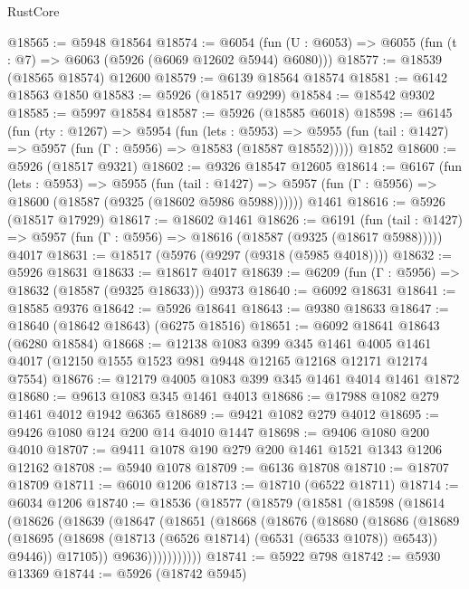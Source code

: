 \begin{lexlean}{RustCore}
\begin{coremodule}
@18565 := @5948 @18564
@18574 := @6054
    (fun (U : @6053) => @6055 (fun (t : @7) => @6063 (@5926 (@6069 @12602 @5944) @6080)))
@18577 := @18539 (@18565 @18574) @12600
@18579 := @6139 @18564 @18574
@18581 := @6142 @18563 @1850
@18583 := @5926 (@18517 @9299)
@18584 := @18542 @9302
@18585 := @5997 @18584
@18587 := @5926 (@18585 @6018)
@18598 := @6145
    (fun (rty : @1267) =>
    @5954
      (fun (lets : @5953) =>
      @5955 (fun (tail : @1427) => @5957 (fun (Γ : @5956) => @18583 (@18587 @18552)))))
    @1852
@18600 := @5926 (@18517 @9321)
@18602 := @9326 @18547 @12605
@18614 := @6167
    (fun (lets : @5953) =>
    @5955
      (fun (tail : @1427) =>
      @5957 (fun (Γ : @5956) => @18600 (@18587 (@9325 (@18602 @5986 @5988))))))
    @1461
@18616 := @5926 (@18517 @17929)
@18617 := @18602 @1461
@18626 := @6191
    (fun (tail : @1427) => @5957 (fun (Γ : @5956) => @18616 (@18587 (@9325 (@18617 @5988)))))
    @4017
@18631 := @18517 (@5976 (@9297 (@9318 (@5985 @4018))))
@18632 := @5926 @18631
@18633 := @18617 @4017
@18639 := @6209 (fun (Γ : @5956) => @18632 (@18587 (@9325 @18633))) @9373
@18640 := @6092 @18631
@18641 := @18585 @9376
@18642 := @5926 @18641
@18643 := @9380 @18633
@18647 := @18640 (@18642 @18643) (@6275 @18516)
@18651 := @6092 @18641 @18643 (@6280 @18584)
@18668 := @12138
    @1083
    @399
    @345
    @1461
    @4005
    @1461
    @4017
    (@12150 @1555 @1523 @981 @9448 @12165 @12168 @12171 @12174 @7554)
@18676 := @12179 @4005 @1083 @399 @345 @1461 @4014 @1461 @1872
@18680 := @9613 @1083 @345 @1461 @4013
@18686 := @17988 @1082 @279 @1461 @4012 @1942 @6365
@18689 := @9421 @1082 @279 @4012
@18695 := @9426 @1080 @124 @200 @14 @4010 @1447
@18698 := @9406 @1080 @200 @4010
@18707 := @9411 @1078 @190 @279 @200 @1461 @1521 @1343 @1206 @12162
@18708 := @5940 @1078
@18709 := @6136 @18708
@18710 := @18707 @18709
@18711 := @6010 @1206
@18713 := @18710 (@6522 @18711)
@18714 := @6034 @1206
@18740 := @18536
    (@18577
      (@18579
        (@18581
          (@18598
            (@18614
              (@18626
                (@18639
                  (@18647
                    (@18651
                      (@18668
                        (@18676
                          (@18680
                            (@18686
                              (@18689
                                (@18695
                                  (@18698 (@18713 (@6526 @18714) (@6531 (@6533 @1078)) @6543))
                                  @9446))
                              @17105))
                          @9636)))))))))))
@18741 := @5922 @798
@18742 := @5930 @13369
@18744 := @5926 (@18742 @5945)

\end{coremodule}
\end{lexlean}
